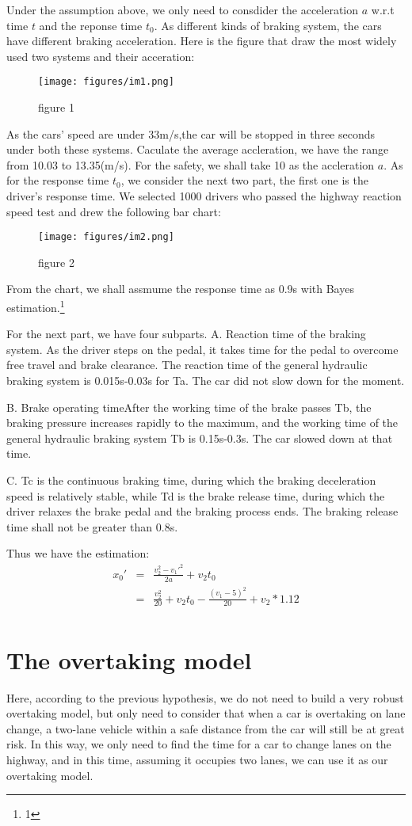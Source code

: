 Under the assumption above, we only need to consdider the acceleration $a$ w.r.t time $t$ and the reponse time $t_0$. As different kinds of braking system, the cars have different braking acceleration. Here is the figure that draw the most widely used two systems and their acceration:
\begin{figure}[htbp]
	\centering
	\texttt{[image: figures/im1.png]}
	\caption{figure 1} 
	\label{pngsample}
\end{figure}
As the cars' speed are under 33m/s,the car will be stopped in three seconds under both these systems. Caculate the average accleration, we have the range from 10.03 to 13.35(m/s). For the safety, we shall take 10 as the accleration $a$.
As for the response time $t_0$, we consider the next two part, the first one is the driver's response time. We selected 1000 drivers who passed the highway reaction speed test and drew the following bar chart:
\begin{figure}[htbp]
	\centering
	\texttt{[image: figures/im2.png]}
	\caption{figure 2} 
	\label{pngsample}
\end{figure}
From the chart, we shall assmume the response time as 0.9s with Bayes estimation.\footnote{1}

For the next part, we have four subparts.
A. Reaction time of the braking system. As the driver steps on the pedal, it takes time for the pedal to overcome free travel and brake clearance. The reaction time of the general hydraulic braking system is 0.015s-0.03s for Ta. The car did not slow down for the moment.

B. Brake operating timeAfter the working time of the brake passes Tb, the braking pressure increases rapidly to the maximum, and the working time of the general hydraulic braking system Tb is 0.15s-0.3s. The car slowed down at that time.

C. Tc is the continuous braking time, during which the braking deceleration speed is relatively stable, while Td is the brake release time, during which the driver relaxes the brake pedal and the braking process ends. The braking release time shall not be greater than 0.8s.

Thus we have the estimation:
\begin{eqnarray}
x_0'&=&\frac{v_2^2-v_1'^2}{2a}+v_2t_0\nonumber \\
&=&\frac{v_2^2}{20}+v_2t_0-\frac{(v_1-5)^2}{20}+v_2*1.12 \\
\end{eqnarray}
\section*{The overtaking model}
Here, according to the previous hypothesis, we do not need to build a very robust overtaking model, but only need to consider that when a car is overtaking on lane change, a two-lane vehicle within a safe distance from the car will still be at great risk. In this way, we only need to find the time for a car to change lanes on the highway, and in this time, assuming it occupies two lanes, we can use it as our overtaking model.

